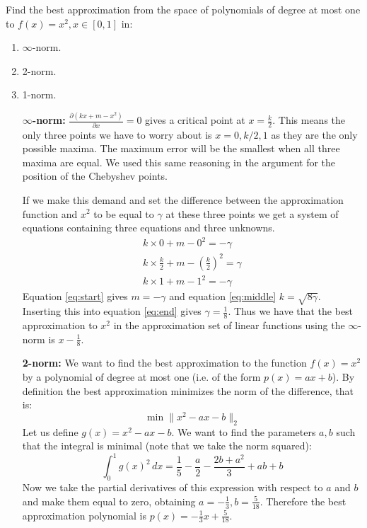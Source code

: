 \begin{problem}
Find the best approximation from the space of polynomials of degree at
most one to $f(x) = x^2 , x \in [0 , 1]$ in:
\begin{enumerate}
\item $\infty$-norm.
\item 2-norm.
\item 1-norm.
\end{enumerate}
\end{problem}

\begin{solution}
  \begin{enumerate}
  \item [{\bf $\infty$-norm: }]
    $\frac{\partial (kx + m - x^2)}{\partial x} = 0$ gives a critical
    point at $x = \frac{k}{2}$. This means the only three points we
    have to worry about is $x = 0, k/2, 1$ as they are the only
    possible maxima. The maximum error will be the smallest when all
    three maxima are equal. We used this same reasoning in the
    argument for the position of the Chebyshev points.

    If we make this demand and set the difference between the
    approximation function and $x^2$ to be equal to $\gamma$ at these
    three points we get a system of equations containing three
    equations and three unknowns.
    \begin{align}
      k \times 0  + m  - 0^2  = -\gamma \label{eq:start}\\
      k \times \frac{k}{2}  + m - \left(\frac{k}{2}\right)^2  = \gamma
      \label{eq:middle}\\
      k \times 1  + m  - 1^2   = -\gamma \label{eq:end}
    \end{align}
    Equation \ref{eq:start} gives $m = - \gamma$ and equation
    \ref{eq:middle} $k = \sqrt{8\gamma}$. Inserting this into equation
    \ref{eq:end} gives $\gamma = \frac{1}{8}$. Thus we have that the
    best approximation to $x^2$ in the approximation set of linear
    functions using the $\infty$-norm is $x - \frac{1}{8}$.
    
  \item[{\bf 2-norm: }] We want to find the best approximation to the
    function $f(x) = x^2$ by a polynomial of degree at most one
    (i.e. of the form $p(x) = ax+b$). By definition the best
    approximation minimizes the norm of the difference, that is:
    \begin{equation*}
      \min \lVert x^2-ax-b \rVert_2
    \end{equation*}
    Let us define $g(x) = x^2-ax-b$. We want to find the parameters
    $a, b$ such that the integral is minimal (note that we take the
    norm squared):
    \begin{equation*}
      \int_0^1 g(x)^2 \, dx = \frac{1}{5} - \frac{a}{2} - \frac{2b+a^2}{3} + ab + b
    \end{equation*}
    Now we take the partial derivatives of this expression with
    respect to $a$ and $b$ and make them equal to zero, obtaining $a =
    -\frac{1}{3}, b = \frac{5}{18}$. Therefore the best approximation
    polynomial is $p(x)=-\frac{1}{3}x + \frac{5}{18}$.
    

\end{enumerate}
\end{solution}
